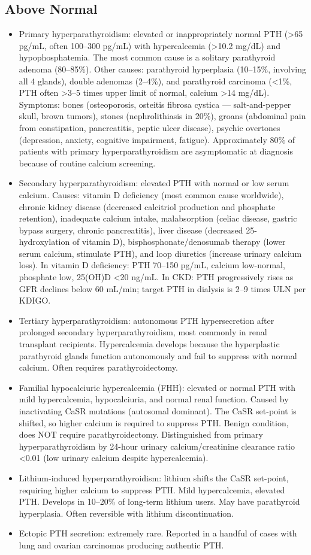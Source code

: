 \subsection*{Above Normal}
\begin{itemize}
  \item Primary hyperparathyroidism: elevated or inappropriately normal PTH (>65 pg/mL, often 100--300 pg/mL) with hypercalcemia (>10.2 mg/dL) and hypophosphatemia. The most common cause is a solitary parathyroid adenoma (80--85\%). Other causes: parathyroid hyperplasia (10--15\%, involving all 4 glands), double adenomas (2--4\%), and parathyroid carcinoma (<1\%, PTH often >3--5 times upper limit of normal, calcium >14 mg/dL). Symptoms: bones (osteoporosis, osteitis fibrosa cystica --- salt-and-pepper skull, brown tumors), stones (nephrolithiasis in 20\%), groans (abdominal pain from constipation, pancreatitis, peptic ulcer disease), psychic overtones (depression, anxiety, cognitive impairment, fatigue). Approximately 80\% of patients with primary hyperparathyroidism are asymptomatic at diagnosis because of routine calcium screening.
  \item Secondary hyperparathyroidism: elevated PTH with normal or low serum calcium. Causes: vitamin D deficiency (most common cause worldwide), chronic kidney disease (decreased calcitriol production and phosphate retention), inadequate calcium intake, malabsorption (celiac disease, gastric bypass surgery, chronic pancreatitis), liver disease (decreased 25-hydroxylation of vitamin D), bisphosphonate/denosumab therapy (lower serum calcium, stimulate PTH), and loop diuretics (increase urinary calcium loss). In vitamin D deficiency: PTH 70--150 pg/mL, calcium low-normal, phosphate low, 25(OH)D <20 ng/mL. In CKD: PTH progressively rises as GFR declines below 60 mL/min; target PTH in dialysis is 2--9 times ULN per KDIGO.
  \item Tertiary hyperparathyroidism: autonomous PTH hypersecretion after prolonged secondary hyperparathyroidism, most commonly in renal transplant recipients. Hypercalcemia develops because the hyperplastic parathyroid glands function autonomously and fail to suppress with normal calcium. Often requires parathyroidectomy.
  \item Familial hypocalciuric hypercalcemia (FHH): elevated or normal PTH with mild hypercalcemia, hypocalciuria, and normal renal function. Caused by inactivating CaSR mutations (autosomal dominant). The CaSR set-point is shifted, so higher calcium is required to suppress PTH. Benign condition, does NOT require parathyroidectomy. Distinguished from primary hyperparathyroidism by 24-hour urinary calcium/creatinine clearance ratio <0.01 (low urinary calcium despite hypercalcemia).
  \item Lithium-induced hyperparathyroidism: lithium shifts the CaSR set-point, requiring higher calcium to suppress PTH. Mild hypercalcemia, elevated PTH. Develops in 10--20\% of long-term lithium users. May have parathyroid hyperplasia. Often reversible with lithium discontinuation.
  \item Ectopic PTH secretion: extremely rare. Reported in a handful of cases with lung and ovarian carcinomas producing authentic PTH.
\end{itemize}


